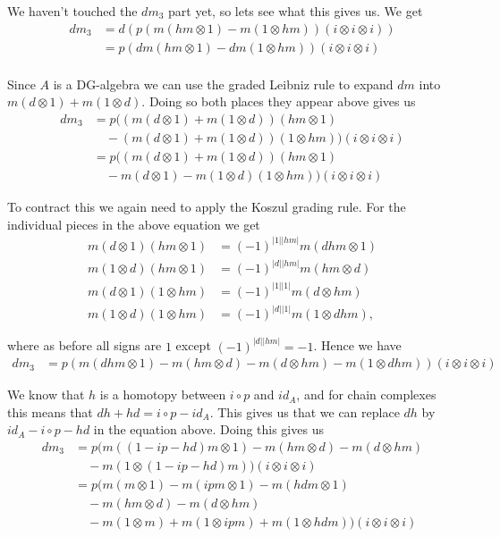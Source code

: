 We haven't touched the $dm_3$ part yet, so lets see what this gives us. We get 
\begin{align*}
    dm_3 
    &= 
    d(p(m(hm\otimes 1)
    -m(1\otimes hm))(i\otimes i\otimes i)) \\
    &= 
    p(dm(hm\otimes 1)
    -dm(1\otimes hm))(i\otimes i\otimes i) \\
\end{align*}

Since $A$ is a DG-algebra we can use the graded Leibniz rule to expand $dm$ into $m(d\otimes 1)+m(1\otimes d)$. Doing so both places they appear above gives us
\begin{align*}
    dm_3 
    &= 
    p((m(d\otimes 1)
    +m(1\otimes d))(hm\otimes 1) \\
    &\quad 
    -(m(d\otimes 1)
    +m(1\otimes d))(1\otimes hm))(i\otimes i\otimes i) \\
    &=
    p((m(d\otimes 1)
    +m(1\otimes d))(hm\otimes 1) \\
    &\quad 
    -m(d\otimes 1)
    -m(1\otimes d)(1\otimes hm))(i\otimes i\otimes i) 
\end{align*}

To contract this we again need to apply the Koszul grading rule. For the individual pieces in the above equation we get
\begin{align*}
    m(d\otimes 1)(hm\otimes 1) &= (-1)^{|1||hm|}m(dhm\otimes 1) \\
    m(1\otimes d)(hm\otimes 1) &= (-1)^{|d||hm|}m(hm\otimes d) \\
    m(d\otimes 1)(1\otimes hm) &= (-1)^{|1||1|}m(d\otimes hm) \\
    m(1\otimes d)(1\otimes hm) &= (-1)^{|d||1|}m(1\otimes dhm),
\end{align*}

where as before all signs are $1$ except $(-1)^{|d||hm|}=-1$. Hence we have 
\begin{align*}
    dm_3 
    &= 
    p(m(dhm\otimes 1)-m(hm\otimes d)-m(d\otimes hm)-m(1\otimes dhm))(i\otimes i\otimes i)
\end{align*}

We know that $h$ is a homotopy between $i\circ p$ and $id_A$, and for chain complexes this means that $dh+hd=i\circ p - id_A$. This gives us that we can replace $dh$ by $id_A-i\circ p-hd$ in the equation above. Doing this gives us 
\begin{align*}
    dm_3 
    &= 
    p(m((1-ip-hd)m\otimes 1)-m(hm\otimes d)-m(d\otimes hm) \\
    &\quad -m(1\otimes (1-ip-hd)m))(i\otimes i\otimes i) \\
    &= 
    p(m(m\otimes 1)-m(ipm\otimes 1)-m(hdm\otimes 1) \\
    &\quad -m(hm\otimes d)-m(d\otimes hm) \\
    &\quad -m(1\otimes m)+m(1\otimes ipm)+m(1\otimes hdm))(i\otimes i\otimes i)
\end{align*}

